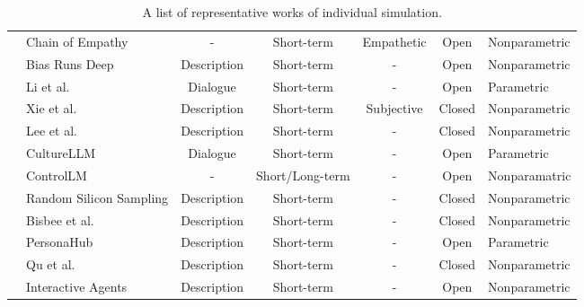 \begin{table}[!htp]
{\begin{tabularx}{\linewidth}{c|>{\centering\arraybackslash}X|c|c|c|c|>{\centering\arraybackslash}m{8em}}
    \cmidrule{2-7}
    & Chain of Empathy \cite{10.19066/COGSCI.2024.35.1.002} & - & Short-term & Empathetic & Open  & Nonparametric  \\
    \cmidrule{2-7}
    & Bias Runs Deep \cite{gupta2024biasrunsdeepimplicit} & Description & Short-term & - & Open  & Nonparametric  \\
    \cmidrule{2-7}
    & Li et al. \cite{li2024steerabilitylargelanguagemodels} & Dialogue & Short-term & - & Open  & Parametric  \\
    \cmidrule{2-7}
    & Xie et al. \cite{xie2024largelanguagemodelagents} & Description & Short-term & Subjective & Closed  & Nonparametric  \\
    \cmidrule{2-7}
    & Lee et al. \cite{Lee_2024} & Description & Short-term & - & Closed  & Nonparametric  \\
    \cmidrule{2-7}
    & CultureLLM \cite{li2024culturellmincorporatingculturaldifferences} & Dialogue & Short-term & - & Open  & Parametric  \\
    \cmidrule{2-7}
    & ControlLM \cite{weng2024controllmcraftingdiversepersonalities} & - & Short/Long-term & - & Open  & Nonparamatric  \\
    \cmidrule{2-7}
    & Random Silicon Sampling \cite{sun2024randomsiliconsamplingsimulating} & Description & Short-term & - & Closed  & Nonparametric  \\
    \cmidrule{2-7}
    & Bisbee et al. \cite{Bisbee_Clinton_Dorff_Kenkel_Larson_2024} & Description & Short-term & - & Closed  & Nonparametric  \\
    \cmidrule{2-7}
    & PersonaHub \cite{ge2024scalingsyntheticdatacreation} & Description & Short-term & - & Open  & Parametric  \\
    \cmidrule{2-7}
    & Qu et al. \cite{Qu2024PerformanceAB} & Description & Short-term & - & Closed  & Nonparametric  \\
    \cmidrule{2-7}
    & Interactive Agents \cite{qiu2024interactiveagentssimulatingcounselorclient} & Description & Short-term & - & Open  & Nonparametric  \\
    \bottomrule
\end{tabularx}}
\caption{A list of representative works of individual simulation.}
\label{tab:indi}
\end{table}